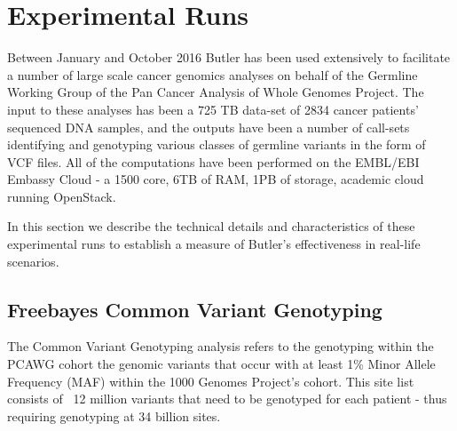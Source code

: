 \section{Experimental Runs}

Between January and October 2016 Butler has been used extensively to facilitate a number of large scale cancer genomics analyses on behalf of the Germline Working Group of the Pan Cancer Analysis of Whole Genomes Project. The input to these analyses has been a 725 TB data-set of 2834 cancer patients' sequenced DNA samples, and the outputs have been a number of call-sets identifying and genotyping various classes of germline variants in the form of VCF files. All of the computations have been performed on the EMBL/EBI Embassy Cloud - a 1500 core, 6TB of RAM, 1PB of storage, academic cloud running OpenStack.

In this section we describe the technical details and characteristics of these experimental runs to establish a measure of Butler's effectiveness in real-life scenarios.

\subsection{Freebayes Common Variant Genotyping}

The Common Variant Genotyping analysis refers to the genotyping within the PCAWG cohort the genomic variants that occur with at least 1\% Minor Allele Frequency (MAF) within the 1000 Genomes Project's\autocite{10002012integrated} cohort. This site list consists of ~12 million variants that need to be genotyped for each patient - thus requiring genotyping at 34 billion sites.

